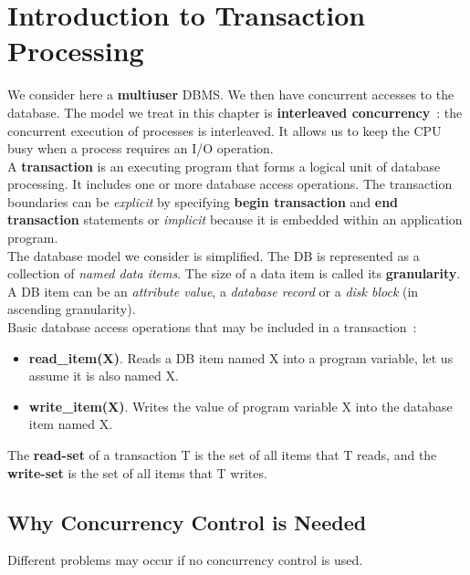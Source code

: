 \section{Introduction to Transaction Processing}
We consider here a \textbf{multiuser} DBMS. We then have concurrent accesses to the database. The model we treat in this chapter is \textbf{interleaved concurrency}~: the concurrent execution of processes is interleaved. It allows us to keep the CPU busy when a process requires an I/O operation. \\

A \textbf{transaction} is an executing program that forms a logical unit of database processing. It includes one or more database access operations. The transaction boundaries can be \textit{explicit} by specifying \textbf{begin transaction} and \textbf{end transaction} statements or \textit{implicit} because it is embedded within an application program. \\

The database model we consider is simplified. The DB is represented as a collection of \textit{named data items}. The size of a data item is called its \textbf{granularity}. A DB item can be an \textit{attribute value}, a \textit{database record} or a \textit{disk block} (in ascending granularity). \\

Basic database access operations that may be included in a transaction~:

\begin{itemize}
    \item \textbf{read\_item(X)}. Reads a DB item named X into a program variable, let us assume it is also named X.
    \item \textbf{write\_item(X)}. Writes the value of program variable X into the database item named X.
\end{itemize}

The \textbf{read-set} of a transaction T is the set of all items that T reads, and the \textbf{write-set} is the set of all items that T writes.

\subsection{Why Concurrency Control is Needed}
Different problems may occur if no concurrency control is used.


